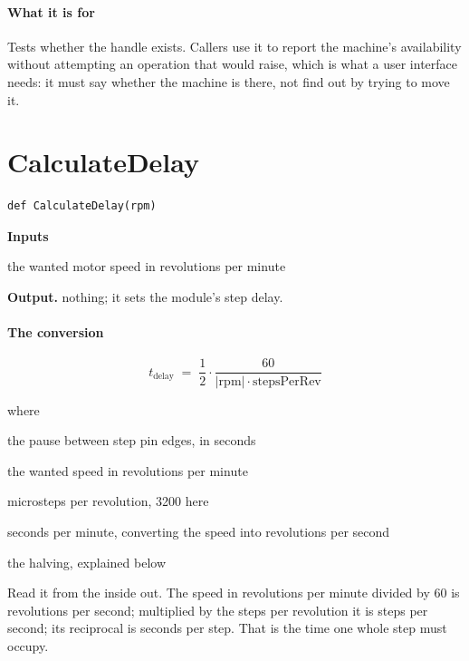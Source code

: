 \paragraph{What it is for}
Tests whether the handle exists. Callers use it to report the machine's availability without attempting an operation that would raise, which is what a user interface needs: it must say whether the machine is there, not find out by trying to move it.


\section{CalculateDelay}
\begin{lstlisting}[style=sig]
def CalculateDelay(rpm)
\end{lstlisting}

\noindent\textbf{Inputs}
\begin{description}[leftmargin=2.2em,style=nextline,font=\normalfont\ttfamily]\setlength\itemsep{1pt}
  \item[{rpm}] \normalfont the wanted motor speed in revolutions per minute
\end{description}

\noindent\textbf{Output.} nothing; it sets the module's step delay.


\paragraph{The conversion}

\begin{equation}
t_{\mathrm{delay}} \;=\; \frac{1}{2} \cdot \frac{60}{|\mathrm{rpm}| \cdot \mathrm{stepsPerRev}}
\end{equation}

\noindent where
\begin{description}[leftmargin=2.4em,style=nextline,font=\normalfont\ttfamily]\setlength\itemsep{1pt}
  \item[{$t_{\mathrm{delay}}$}] \normalfont the pause between step pin edges, in seconds
  \item[{$\mathrm{rpm}$}] \normalfont the wanted speed in revolutions per minute
  \item[{$\mathrm{stepsPerRev}$}] \normalfont microsteps per revolution, 3200 here
  \item[{$60$}] \normalfont seconds per minute, converting the speed into revolutions per second
  \item[{$\tfrac{1}{2}$}] \normalfont the halving, explained below
\end{description}
Read it from the inside out. The speed in revolutions per minute divided by 60 is revolutions per second; multiplied by the steps per revolution it is steps per second; its reciprocal is seconds per step. That is the time one whole step must occupy.


